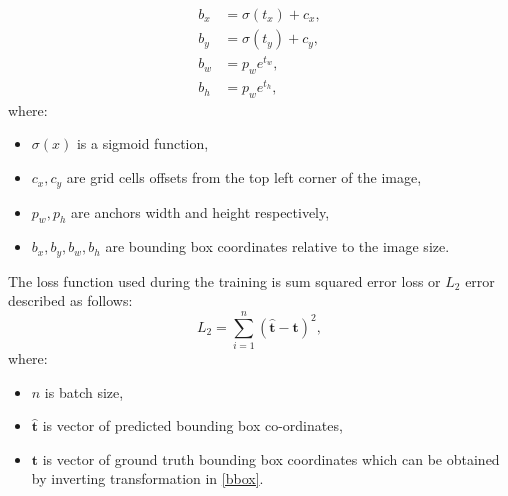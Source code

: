 \documentclass[twoside]{ctuthesis}
\theoremstyle{plain}
\theoremstyle{definition}
\theoremstyle{note}
\begin{document}
\begin{equation}\label{bbox}
	\begin{aligned}
		b_x&=\sigma(t_x)+c_x,\\
		b_y&=\sigma(t_y)+c_y,\\
		b_w&=p_{w}e^{t_w},\\
		b_h&=p_{w}e^{t_h},
	\end{aligned}
\end{equation}
where:
\begin{itemize}
	\item $\sigma(x)$ is a sigmoid function,
	\item $c_x, c_y$ are grid cells offsets from the top left corner of the image,
	\item $p_w, p_h$ are anchors width and height respectively,
	\item $b_x, b_y, b_w, b_h$ are bounding box coordinates relative to the image size.
\end{itemize}
The loss function used during the training is sum squared error loss or $L_2$ error described as follows:
\begin{equation}
	L_2=\sum_{i=1}^{n}(\mathbf{\hat{t}}-\mathbf{t})^2,
\end{equation}
where:
\begin{itemize}
	\item $n$ is batch size,
	\item $\mathbf{\hat{t}}$ is vector of predicted bounding box co-ordinates,
	\item $\mathbf{t}$ is vector of ground truth bounding box coordinates which can be obtained by inverting transformation in \ref{bbox}.
\end{itemize}
\end{document}
